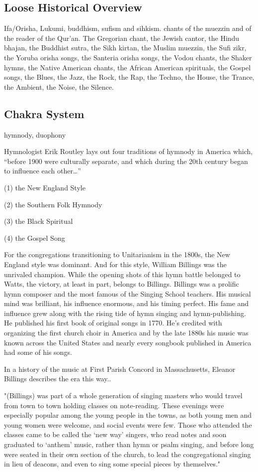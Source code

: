 \documentclass[12pt]{article}
\begin{document}
\subsection*{Loose Historical Overview}

Ifa/Orisha, Lukumi, buddhism, sufism and sihkism. chants of the muezzin and of the reader of the Qur'an. The Gregorian chant, the Jewish cantor, the Hindu bhajan, the Buddhist sutra, the Sikh kirtan, the Muslim muezzin, the Sufi zikr, the Yoruba orisha songs, the Santeria orisha songs, the Vodou chants, the Shaker hymns, the Native American chants, the African American spirituals, the Gospel songs, the Blues, the Jazz, the Rock, the Rap, the Techno, the House, the Trance, the Ambient, the Noise, the Silence.

\subsection*{Chakra System}

hymnody, duophony

Hymnologist Erik Routley lays out four traditions of hymnody in America which, “before 1900 were culturally separate, and which during the 20th century began to influence each other…”

(1) the New England Style

(2) the Southern Folk Hymnody

(3) the Black Spiritual

(4) the Gospel Song

For the congregations transitioning to Unitarianism in the 1800s, the New England style was dominant. And for this style, William Billings was the unrivaled champion. While the opening shots of this hymn battle belonged to Watts, the victory, at least in part, belongs to Billings. Billings was a prolific hymn composer and the most famous of the Singing School teachers. His musical mind was brilliant, his influence enormous, and his timing perfect. His fame and influence grew along with the rising tide of hymn singing and hymn-publishing. He published his first book of original songs in 1770. He’s credited with organizing the first church choir in America and by the late 1880s his music was known across the United States and nearly every songbook published in America had some of his songs.

In a history of the music at First Parish Concord in Massachusetts, Eleanor Billings describes the era this way..

"(Billings) was part of a whole generation of singing masters who would travel from town to town holding classes on note-reading. These evenings were especially popular among the young people in the towns, as both young men and young women were welcome, and social events were few. Those who attended the classes came to be called the ‘new way’ singers, who read notes and soon graduated to ‘anthem’ music, rather than hymn or psalm singing, and before long were seated in their own section of the church, to lead the congregational singing in lieu of deacons, and even to sing some special pieces by themselves."
\end{document}
